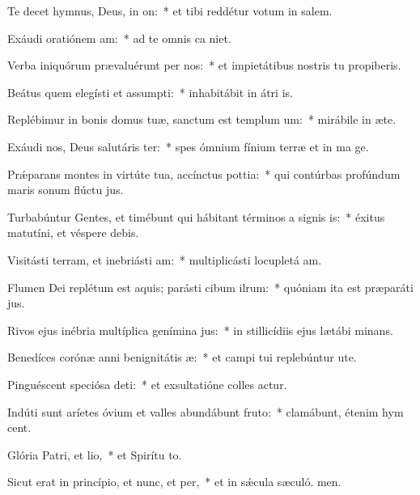 \item Te decet hymnus, Deus, in on:~* et tibi reddétur votum in salem.
\item Exáudi oratiónem am:~* ad te omnis ca niet.
\item Verba iniquórum prævaluérunt per nos:~* et impietátibus nostris tu propiberis.
\item Beátus quem elegísti et assumpti:~* inhabitábit in átri is.
\item Replébimur in bonis domus tuæ, sanctum est templum um:~* mirábile in æte.
\item Exáudi nos, Deus salutáris ter:~* spes ómnium fínium terræ et in ma ge.
\item Prǽparans montes in virtúte tua, accínctus pottia:~* qui contúrbas profúndum maris sonum flúctu jus.
\item Turbabúntur Gentes, et timébunt qui hábitant términos a signis is:~* éxitus matutíni, et véspere debis.
\item Visitásti terram, et inebriásti am:~* multiplicásti locupletá am.
\item Flumen Dei replétum est aquis; parásti cibum ilrum:~* quóniam ita est præparáti jus.
\item Rivos ejus inébria multíplica genímina jus:~* in stillicídiis ejus lætábi minans.
\item Benedíces corónæ anni benignitátis æ:~* et campi tui replebúntur ute.
\item Pinguéscent speciósa deti:~* et exsultatióne colles actur.
\item Indúti sunt aríetes óvium et valles abundábunt fruto:~* clamábunt, étenim hym cent.
\item Glória Patri, et lio,~* et Spirítu to.
\item Sicut erat in princípio, et nunc, et per,~* et in sǽcula sæculó. men.

